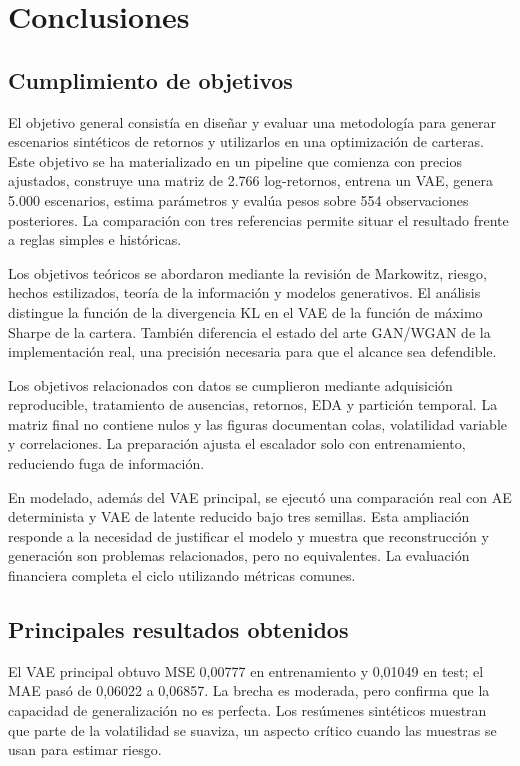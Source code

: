 \clearpage
\chapter{Conclusiones}

\section{Cumplimiento de objetivos}

El objetivo general consistía en diseñar y evaluar una metodología para generar escenarios sintéticos de retornos y utilizarlos en una optimización de carteras. Este objetivo se ha materializado en un pipeline que comienza con precios ajustados, construye una matriz de 2.766 log-retornos, entrena un VAE, genera 5.000 escenarios, estima parámetros y evalúa pesos sobre 554 observaciones posteriores. La comparación con tres referencias permite situar el resultado frente a reglas simples e históricas.

Los objetivos teóricos se abordaron mediante la revisión de Markowitz, riesgo, hechos estilizados, teoría de la información y modelos generativos. El análisis distingue la función de la divergencia KL en el VAE de la función de máximo Sharpe de la cartera. También diferencia el estado del arte GAN/WGAN de la implementación real, una precisión necesaria para que el alcance sea defendible.

Los objetivos relacionados con datos se cumplieron mediante adquisición reproducible, tratamiento de ausencias, retornos, EDA y partición temporal. La matriz final no contiene nulos y las figuras documentan colas, volatilidad variable y correlaciones. La preparación ajusta el escalador solo con entrenamiento, reduciendo fuga de información.

En modelado, además del VAE principal, se ejecutó una comparación real con AE determinista y VAE de latente reducido bajo tres semillas. Esta ampliación responde a la necesidad de justificar el modelo y muestra que reconstrucción y generación son problemas relacionados, pero no equivalentes. La evaluación financiera completa el ciclo utilizando métricas comunes.

\section{Principales resultados obtenidos}

El VAE principal obtuvo MSE 0,00777 en entrenamiento y 0,01049 en test; el MAE pasó de 0,06022 a 0,06857. La brecha es moderada, pero confirma que la capacidad de generalización no es perfecta. Los resúmenes sintéticos muestran que parte de la volatilidad se suaviza, un aspecto crítico cuando las muestras se usan para estimar riesgo.

